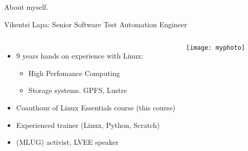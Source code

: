 \begin{frame}{About myself.}

    Vikentsi Lapa: Senior Software Test Automation Engineer
    \begin{columns}
            \begin{itemize}
                \item 9 years hands on experience with Linux:
                \begin{itemize}
                    \item High Perfomance Computing
                    \item Storage systems. GPFS, Lustre
                \end{itemize}
                \item Coauthour of Linux Essentials course (this course)
                \item Experienced trainer (Linux, Python, Scratch) 
                \item (MLUG) activist, LVEE speaker
            \end{itemize}
            \center\texttt{[image: myphoto]}
    \end{columns}
\end{frame}
